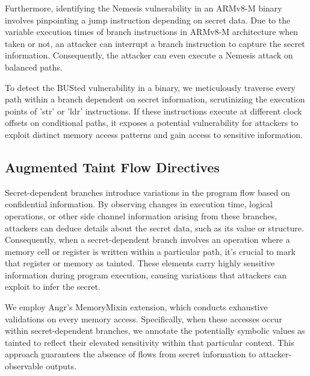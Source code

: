 Furthermore, identifying the Nemesis vulnerability in an ARMv8-M binary
involves pinpointing a jump instruction depending on secret data. Due to
the variable execution times of branch instructions in ARMv8-M architecture
when taken or not, an attacker can interrupt a branch instruction to
capture the secret information. Consequently, the attacker can even execute
a Nemesis attack on balanced paths.

To detect the BUSted vulnerability in a binary, we meticulously traverse
every path within a branch dependent on secret information, scrutinizing
the execution points of 'str' or 'ldr' instructions. If these instructions
execute at different clock offsets on conditional paths, it exposes a
potential vulnerability for attackers to exploit distinct memory access
patterns and gain access to sensitive information.

\subsection{Augmented Taint Flow Directives}

Secret-dependent branches introduce variations in the program flow based on
confidential information. By observing changes in execution time, logical
operations, or other side channel information arising from these branches,
attackers can deduce details about the secret data, such as its value or
structure. Consequently, when a secret-dependent branch involves an
operation where a memory cell or register is written within a particular
path, it's crucial to mark that register or memory as tainted. These
elements carry highly sensitive information during program execution,
causing variations that attackers can exploit to infer the secret.

We employ Angr’s MemoryMixin extension, which conducts exhaustive
validations on every memory access. Specifically, when these accesses occur
within secret-dependent branches, we annotate the potentially symbolic
values as tainted to reflect their elevated sensitivity within that
particular context. This approach guarantees the absence of flows from
secret information to attacker-observable outputs.
